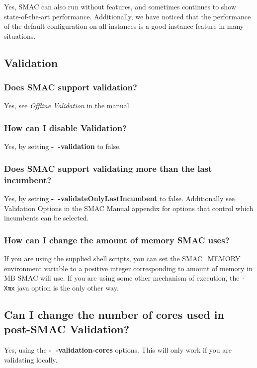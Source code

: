 \documentclass[11pt,letterpaper,oneside]{article}
\begin{document}
	Yes, SMAC can also run without features, and sometimes continues to show state-of-the-art performance. Additionally, we have noticed that the performance of the default configuration on all instances is a good instance feature in many situations.


\subsection{Validation}

\subsubsection{Does SMAC support validation?}

	Yes, see \emph{Offline Validation} in the manual.

	
\subsubsection{How can I disable Validation?}

	Yes, by setting \textbf{-~$\!$-validation} to false.
	
\subsubsection{Does SMAC support validating more than the last incumbent?}

	Yes, by setting \textbf{-~$\!$-validateOnlyLastIncumbent} to false. Additionally see {Validation Options} in the SMAC Manual appendix for options that control which incumbents can be selected.


\subsubsection{How can I change the amount of memory SMAC uses?}

If you are using the supplied shell scripts, you can set the SMAC\_MEMORY environment variable to a positive integer corresponding to amount of memory in MB SMAC will use. If you are using some other mechanism of execution, the \texttt{-Xmx} java option is the only other way.

\subsection{Can I change the number of cores used in post-SMAC Validation?}

Yes, using the \textbf{-~$\!$-validation-cores} options. This will only work
if you are validating locally.
\end{document}
